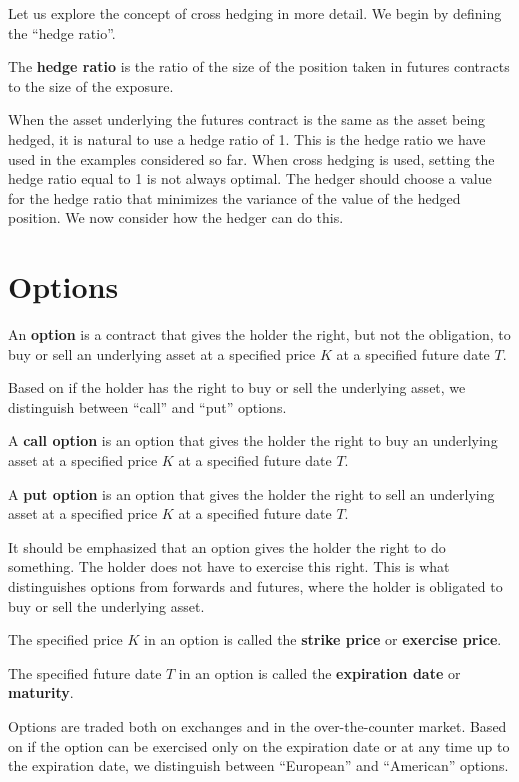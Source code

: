 Let us explore the concept of cross hedging in more detail. We begin by defining the ``hedge ratio''.

The \textbf{hedge ratio} is the ratio of the size of the position taken in futures contracts to the size of the
exposure.
\ed

When the asset underlying the futures contract is the same as the asset being hedged, it is natural to use a hedge
ratio of 1. This is the hedge ratio we have used in the examples considered so far. When cross hedging is used,
setting the hedge ratio equal to 1 is not always optimal. The hedger should choose a value for the hedge ratio that
minimizes the variance of the value of the hedged position. We now consider how the hedger can do this.

\section{Options}

\bd[Option]
An \textbf{option} is a contract that gives the holder the right, but not the obligation, to buy or sell an underlying
asset at a specified price $K$ at a specified future date $T$.
\ed

Based on if the holder has the right to buy or sell the underlying asset, we distinguish between ``call'' and ``put''
options.

A \textbf{call option} is an option that gives the holder the right to buy an underlying asset at a specified price $K$
at a specified future date $T$.
\ed

A \textbf{put option} is an option that gives the holder the right to sell an underlying asset at a specified price $K$
at a specified future date $T$.
\ed

It should be emphasized that an option gives the holder the right to do something. The holder does not have to
exercise this right. This is what distinguishes options from forwards and futures, where the holder is obligated to
buy or sell the underlying asset.

The specified price $K$ in an option is called the \textbf{strike price} or \textbf{exercise price}.
\ed

The specified future date $T$ in an option is called the \textbf{expiration date} or \textbf{maturity}.
\ed

Options are traded both on exchanges and in the over-the-counter market. Based on if the option can be exercised only
on the expiration date or at any time up to the expiration date, we distinguish between ``European'' and ``American''
options.

